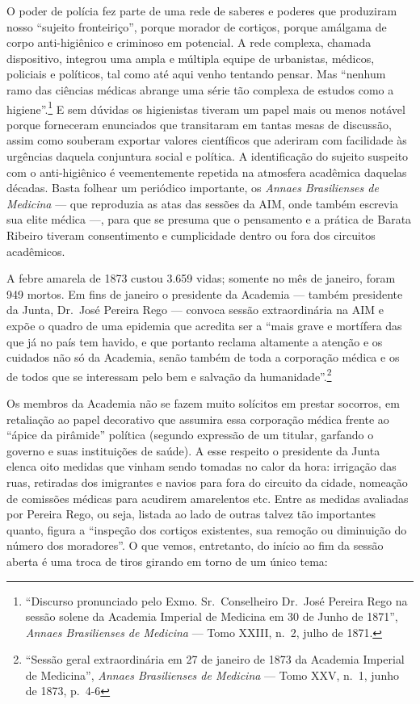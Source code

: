 O poder de polícia fez parte de uma rede de saberes e poderes que
produziram nosso ``sujeito fronteiriço'', porque morador de cortiços,
porque amálgama de corpo anti-higiênico e criminoso em potencial. A rede
complexa, chamada dispositivo, integrou uma ampla e múltipla equipe de
urbanistas, médicos, policiais e políticos, tal como até aqui venho
tentando pensar. Mas ``nenhum ramo das ciências médicas abrange uma
série tão complexa de estudos como a higiene''.\footnote{``Discurso
  pronunciado pelo Exmo. Sr.~Conselheiro Dr.~José Pereira Rego na sessão
  solene da Academia Imperial de Medicina em 30 de Junho de 1871'',
  \textit{Annaes Brasilienses de Medicina} --- Tomo XXIII, n.~2, julho de
  1871.} E sem dúvidas os higienistas tiveram um papel mais ou menos
notável porque forneceram enunciados que transitaram em tantas mesas de
discussão, assim como souberam exportar valores científicos que aderiram
com facilidade às urgências daquela conjuntura social e política. A
identificação do sujeito suspeito com o anti-higiênico é veementemente
repetida na atmosfera acadêmica daquelas décadas. Basta folhear um
periódico importante, os \textit{Annaes Brasilienses de Medicina} --- que
reproduzia as atas das sessões da AIM, onde também escrevia sua elite
médica ---, para que se presuma que o pensamento e a prática de Barata
Ribeiro tiveram consentimento e cumplicidade dentro ou fora dos
circuitos acadêmicos.

A febre amarela de 1873 custou 3.659 vidas; somente no mês de janeiro,
foram 949 mortos. Em fins de janeiro o presidente da Academia --- também
presidente da Junta, Dr.~José Pereira Rego --- convoca sessão
extraordinária na AIM e expõe o quadro de uma epidemia que acredita ser
a ``mais grave e mortífera das que já no país tem havido, e que portanto
reclama altamente a atenção e os cuidados não só da Academia, senão
também de toda a corporação médica e os de todos que se interessam pelo
bem e salvação da humanidade''.\footnote{``Sessão geral extraordinária
  em 27 de janeiro de 1873 da Academia Imperial de Medicina'',
  \textit{Annaes Brasilienses de Medicina} --- Tomo XXV, n.~1, junho de
  1873, p.~4-6}

Os membros da Academia não se fazem muito solícitos em prestar socorros,
em retaliação ao papel decorativo que assumira essa corporação médica
frente ao ``ápice da pirâmide'' política (segundo expressão de um
titular, garfando o governo e suas instituições de saúde). A esse
respeito o presidente da Junta elenca oito medidas que vinham sendo
tomadas no calor da hora: irrigação das ruas, retiradas dos imigrantes e
navios para fora do circuito da cidade, nomeação de comissões médicas
para acudirem amarelentos etc. Entre as medidas avaliadas por Pereira
Rego, ou seja, listada ao lado de outras talvez tão importantes quanto,
figura a ``inspeção dos cortiços existentes, sua remoção ou diminuição
do número dos moradores''. O que vemos, entretanto, do início ao fim da
sessão aberta é uma troca de tiros girando em torno de um único tema:

